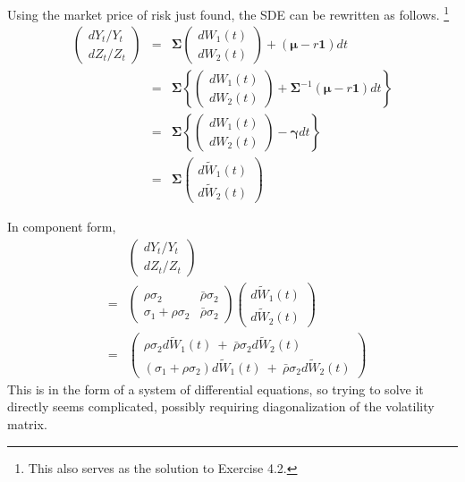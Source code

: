\documentclass[uplatex,a4j,12pt,dvipdfmx]{jsarticle}
\begin{document}
Using the market price of risk just found, the SDE can be rewritten as follows.
\footnote{This also serves as the solution to Exercise 4.2.}
%
%
\begin{eqnarray*}
	\left(
	\begin{array}{c}
			d Y_{t} / Y_{t}
			\\
			d Z_{t} / Z_{t}
		\end{array}
	\right)
	&=&
	{\bm \Sigma}
	\left(
	\begin{array}{c}
			dW_{1}(t)
			\\
			dW_{2}(t)
		\end{array}
	\right)
	+
	( {\bm \mu} - r {\bm 1} ) dt
	\\ &=&
	{\bm \Sigma}
	\left\{
	\left(
	\begin{array}{c}
			dW_{1}(t)
			\\
			dW_{2}(t)
		\end{array}
	\right)
	+
	{\bm \Sigma}^{-1}
	( {\bm \mu} - r {\bm 1} ) dt
	\right\}
	\\ &=&
	{\bm \Sigma}
	\left\{
	\left(
	\begin{array}{c}
			dW_{1}(t)
			\\
			dW_{2}(t)
		\end{array}
	\right)
	-
	{\bm \gamma} dt
	\right\}
	\\ &=&
	{\bm \Sigma}
	\left(
	\begin{array}{c}
			d \tilde{W}_{1}(t)
			\\
			d \tilde{W}_{2}(t)
		\end{array}
	\right)
\end{eqnarray*}
%
%

In component form,
%
%
\begin{eqnarray*}
	&&
	\left(
	\begin{array}{c}
		d Y_{t} / Y_{t}
		\\
		d Z_{t} / Z_{t}
	\end{array}
	\right)
	\\ &=&
	\left(
	\begin{array}{cc}
		\rho \sigma_{2}              & \bar{\rho} \sigma_{2}
		\\
		\sigma_{1} + \rho \sigma_{2} & \bar{\rho} \sigma_{2}
	\end{array}
	\right)
	\left(
	\begin{array}{c}
		d \tilde{W}_{1}(t)
		\\
		d \tilde{W}_{2}(t)
	\end{array}
	\right)
	\\ &=&
	\left(
	\begin{array}{l}
		\rho \sigma_{2} d \tilde{W}_{1}(t) \ + \ \bar{\rho} \sigma_{2} d \tilde{W}_{2}(t)
		\\
		( \sigma_{1} + \rho \sigma_{2} ) d \tilde{W}_{1}(t) \ + \ \bar{\rho} \sigma_{2} d \tilde{W}_{2}(t)
	\end{array}
	\right)
\end{eqnarray*}
%
%
This is in the form of a system of differential equations, so trying to solve it directly seems complicated, possibly requiring diagonalization of the volatility matrix.
\end{document}
